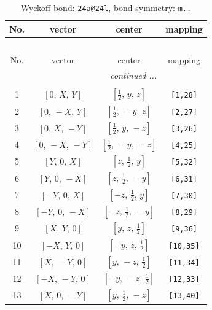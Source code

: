 \documentclass[fleqn,8pt]{jsarticle}
\begin{document}
\begin{longtable}{cccc}
\caption{Wyckoff bond: {\tt 24a@24l}, bond symmetry: {\tt m..}}
 \\
 \hline \hline
No. & vector & center & mapping \\ \hline \endfirsthead

\multicolumn{3}{l}{\tablename\ \thetable{}} \\
 \hline \hline
No. & vector & center & mapping \\ \hline \endhead

 \hline \hline
\multicolumn{3}{r}{\footnotesize\it continued ...} \\ \endfoot

 \hline \hline
\multicolumn{3}{r}{} \\ \endlastfoot

1 & $\left[ 0,\, X,\, Y \right]$ & $\left[ \frac{1}{2},\, y,\, z \right]$ & {\tt [1,28]} \\ \hline
2 & $\left[ 0,\, - X,\, Y \right]$ & $\left[ \frac{1}{2},\, - y,\, z \right]$ & {\tt [2,27]} \\ \hline
3 & $\left[ 0,\, X,\, - Y \right]$ & $\left[ \frac{1}{2},\, y,\, - z \right]$ & {\tt [3,26]} \\ \hline
4 & $\left[ 0,\, - X,\, - Y \right]$ & $\left[ \frac{1}{2},\, - y,\, - z \right]$ & {\tt [4,25]} \\ \hline
5 & $\left[ Y,\, 0,\, X \right]$ & $\left[ z,\, \frac{1}{2},\, y \right]$ & {\tt [5,32]} \\ \hline
6 & $\left[ Y,\, 0,\, - X \right]$ & $\left[ z,\, \frac{1}{2},\, - y \right]$ & {\tt [6,31]} \\ \hline
7 & $\left[ - Y,\, 0,\, X \right]$ & $\left[ - z,\, \frac{1}{2},\, y \right]$ & {\tt [7,30]} \\ \hline
8 & $\left[ - Y,\, 0,\, - X \right]$ & $\left[ - z,\, \frac{1}{2},\, - y \right]$ & {\tt [8,29]} \\ \hline
9 & $\left[ X,\, Y,\, 0 \right]$ & $\left[ y,\, z,\, \frac{1}{2} \right]$ & {\tt [9,36]} \\ \hline
10 & $\left[ - X,\, Y,\, 0 \right]$ & $\left[ - y,\, z,\, \frac{1}{2} \right]$ & {\tt [10,35]} \\ \hline
11 & $\left[ X,\, - Y,\, 0 \right]$ & $\left[ y,\, - z,\, \frac{1}{2} \right]$ & {\tt [11,34]} \\ \hline
12 & $\left[ - X,\, - Y,\, 0 \right]$ & $\left[ - y,\, - z,\, \frac{1}{2} \right]$ & {\tt [12,33]} \\ \hline
13 & $\left[ X,\, 0,\, - Y \right]$ & $\left[ y,\, \frac{1}{2},\, - z \right]$ & {\tt [13,40]} \\ \hline

\end{longtable}
\end{document}
